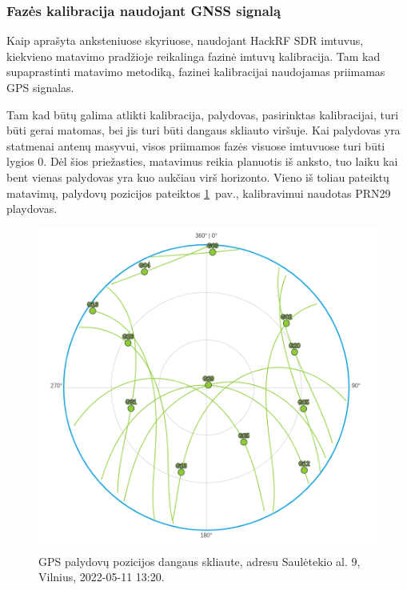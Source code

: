 \documentclass[main.tex]{subfiles}
\begin{document}
\subsubsection{Fazės kalibracija naudojant GNSS signalą}

Kaip aprašyta anksteniuose skyriuose, naudojant HackRF SDR imtuvus, kiekvieno
matavimo pradžioje reikalinga fazinė imtuvų kalibracija. Tam kad supaprastinti
matavimo metodiką, fazinei kalibracijai naudojamas priimamas GPS signalas.

Tam kad būtų galima atlikti kalibracija, palydovas, pasirinktas kalibracijai,
turi būti gerai matomas, bei jis turi būti dangaus skliauto viršuje.
Kai palydovas yra statmenai antenų masyvui, visos priimamos fazės visuose
imtuvuose turi būti lygios 0. Dėl šios priežasties, matavimus reikia
planuotis iš anksto, tuo laiku kai bent vienas palydovas yra
kuo aukčiau virš horizonto. Vieno iš toliau pateiktų matavimų,
palydovų pozicijos pateiktos \ref{fig:gnss_sat_pos_calibartion}~pav.,
kalibravimui naudotas PRN29 playdovas.

\begin{figure}[ht]
    \begin{centering}
    \includegraphics[scale=1.2]{drawings/gnss_sattelites_position}
    \par\end{centering}
    \protect\caption{\label{fig:gnss_sat_pos_calibartion}GPS palydovų pozicijos dangaus skliaute, adresu Saulėtekio al. 9, Vilnius, 2022-05-11 13:20.}
\end{figure}
\end{document}
